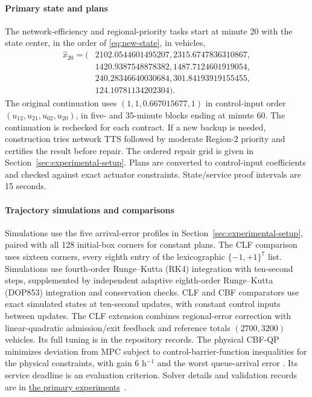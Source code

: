 \documentclass[preprint,12pt]{elsarticle}
\theoremstyle{definition}
\theoremstyle{plain}
\theoremstyle{definition}
\theoremstyle{plain}
\newcommand{\reproductiondetails}[1]{\href{https://github.com/AlienEslami/agentic-perimeter-runtime-certification/releases/tag/paper-2026-11-10}{#1}~\cite{perimeterReproductionGuide}}
\begin{document}
\paragraph{Primary state and plans}
The network-efficiency and regional-priority tasks start at minute 20 with the state center, in the order of
\eqref{eq:new-state}, in vehicles,
\[
\begin{aligned}
\widehat x_{20}=(&2102.0544601495207,2315.6747836310867,\\
&1420.9387548878382,1487.7124601919054,\\
&240.28346640030684,301.84193919155455,\\
&124.10781134202304).
\end{aligned}
\]
The original continuation uses $(1,1,0.667015677,1)$ in control-input order
$(u_{12},u_{21},u_{02},u_{20})$, in five- and
35-minute blocks ending at minute 60. The continuation is rechecked for
each contract. If a new backup is needed, construction tries network TTS
followed by moderate Region-2 priority and certifies the result before
repair. The ordered repair grid is given in Section~\ref{sec:experimental-setup}.
Plans are converted to control-input coefficients and checked against exact
actuator constraints. State/service proof intervals are 15 seconds.

\paragraph{Trajectory simulations and comparisons}
Simulations use the five arrival-error profiles in
Section~\ref{sec:experimental-setup}, paired with all 128 initial-box
corners for constant plans. The CLF comparison uses sixteen corners,
every eighth entry of the lexicographic $\{-1,+1\}^7$ list.
Simulations use fourth-order Runge--Kutta
(RK4) integration with ten-second steps, supplemented by independent
adaptive eighth-order Runge--Kutta (DOP853) integration and conservation
checks. CLF and CBF comparators use exact simulated states at ten-second
updates, with constant control inputs between updates.
The CLF extension combines regional-error correction with
linear-quadratic admission/exit feedback and reference totals
$(2700,3200)$ vehicles. Its full tuning is in the repository records. The physical CBF-QP minimizes deviation from
MPC subject to control-barrier-function inequalities for the physical constraints, with gain $6$ h$^{-1}$
and the worst queue-arrival error \cite{ames2017}. Its service deadline
is an evaluation criterion. Solver details and validation records are in
\reproductiondetails{the primary experiments}.
\end{document}
